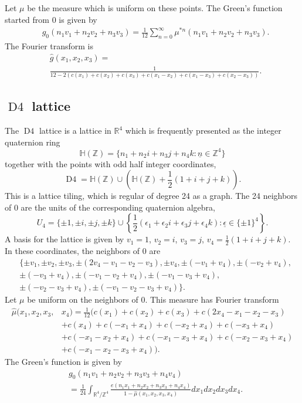 \documentclass[a4paper, 12pt, notitlepage]{amsart}
\newcommand{\Dfour}{\operatorname{D4}}
\newcommand{\bH}{\mathbb{H}}
\newcommand{\bR}{\mathbb{R}}
\newcommand{\zed}{\mathbb{Z}}
\newcommand{\ueps}{\underline{\epsilon}}
\newcommand{\un}{\underline{n}}
\theoremstyle{remark}
\begin{document}
Let $\mu$ be the measure which is uniform on these points. 
The Green's function started from 0 is given by
\begin{align*}
& g_0(n_1v_1 + n_2v_2 + n_3v_3) = \frac{1}{12} \sum_{n=0}^\infty \mu^{*n}(n_1v_1 +n_2v_2 + n_3v_3).
\end{align*}
The Fourier transform is
\begin{align*}
 &\hat{g}(x_1, x_2, x_3)=\\& \frac{1}{12 -2 (c(x_1) + c(x_2) + c(x_3) + c(x_1-x_2) + c(x_1-x_3) + c(x_2-x_3)) }.
\end{align*}


\subsection{$\Dfour$ lattice} The $\Dfour$ lattice is a lattice in $\bR^4$ which is frequently presented as the integer quaternion ring
\begin{equation}
 \bH(\zed) = \{n_1 + n_2 i + n_3 j + n_4k: \un \in \zed^4\}
\end{equation}
together with the points with odd half integer coordinates, 
\begin{equation}
 \Dfour = \bH(\zed) \cup \left(\bH(\zed) + \frac{1}{2}(1 + i +j+k)\right).
\end{equation}
This is a lattice tiling, which is regular of degree 24 as a graph.  The 24 neighbors of 0 are the units of the corresponding quaternion algebra,
\begin{equation}
U_4= \{\pm 1, \pm i, \pm j, \pm k\} \cup \left\{\frac{1}{2}(\epsilon_1+ \epsilon_2i+ \epsilon_3j+ \epsilon_4 k): \ueps \in \{\pm 1\}^4\right\}. 
\end{equation}
A basis for the lattice is given by $v_1 = 1$, $v_2 = i$, $v_3 = j$, $v_4 = \frac{1}{2}(1 + i +j + k)$. In these coordinates, the neighbors of 0 are
\begin{align*}
 &\{\pm v_1, \pm v_2, \pm v_3, \pm (2v_4 -v_1-v_2-v_3), \pm v_4, \pm (-v_1 + v_4), \pm(-v_2 + v_4), \\&\pm(-v_3+v_4), \pm(-v_1-v_2 + v_4), \pm(-v_1-v_3+v_4),\\& \pm (-v_2-v_3+v_4), \pm(-v_1-v_2-v_3+v_4)\}.
\end{align*}
Let $\mu$ be uniform on the neighbors of 0.  This measure has Fourier transform
\begin{align*}
 \hat{\mu}(x_1,x_2,x_3,&x_4) = \frac{1}{12}( c(x_1)+ c(x_2) + c(x_3) + c(2x_4-x_1-x_2-x_3)\\& + c(x_4) + c(-x_1 + x_4) + c(-x_2 + x_4) + c(-x_3+x_4)\\& + c(-x_1-x_2+x_4) + c(-x_1 -x_3 +x_4) + c(-x_2-x_3+x_4)\\& + c(-x_1-x_2-x_3+x_4)).
\end{align*}
The Green's function is given by
\begin{align*}
 &g_0(n_1v_1+n_2v_2+n_3v_3+n_4v_4) \\&= \frac{1}{24}\int_{\bR^4/\zed^4} \frac{e(n_1x_1+n_2x_2+n_3x_3+n_4x_4)}{1-\hat{\mu}(x_1,x_2,x_3,x_4)}dx_1dx_2dx_3dx_4.
\end{align*}
\end{document}
